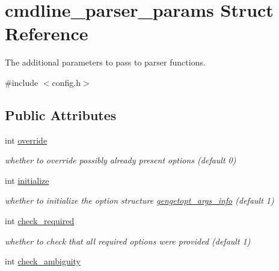 \hypertarget{structcmdline__parser__params}{}\section{cmdline\+\_\+parser\+\_\+params Struct Reference}
\label{structcmdline__parser__params}


The additional parameters to pass to parser functions.  




{\ttfamily \#include $<$config.\+h$>$}

\subsection*{Public Attributes}
\begin{DoxyCompactItemize}
\item 
\hypertarget{structcmdline__parser__params_ad3ff9d69146e69a47506782197b5675c}{}int \hyperlink{structcmdline__parser__params_ad3ff9d69146e69a47506782197b5675c}{override}\label{structcmdline__parser__params_ad3ff9d69146e69a47506782197b5675c}

\begin{DoxyCompactList}\small\item\em whether to override possibly already present options (default 0) \end{DoxyCompactList}\item 
\hypertarget{structcmdline__parser__params_a97ed8a6eabd39291ae7d73f273e12c11}{}int \hyperlink{structcmdline__parser__params_a97ed8a6eabd39291ae7d73f273e12c11}{initialize}\label{structcmdline__parser__params_a97ed8a6eabd39291ae7d73f273e12c11}

\begin{DoxyCompactList}\small\item\em whether to initialize the option structure \hyperlink{structgengetopt__args__info}{gengetopt\+\_\+args\+\_\+info} (default 1) \end{DoxyCompactList}\item 
\hypertarget{structcmdline__parser__params_a44ff439d7e9e36799e59173af74829c6}{}int \hyperlink{structcmdline__parser__params_a44ff439d7e9e36799e59173af74829c6}{check\+\_\+required}\label{structcmdline__parser__params_a44ff439d7e9e36799e59173af74829c6}

\begin{DoxyCompactList}\small\item\em whether to check that all required options were provided (default 1) \end{DoxyCompactList}\item 
\hypertarget{structcmdline__parser__params_a6e4442704fc40b0b655f7cc602f13ec4}{}int \hyperlink{structcmdline__parser__params_a6e4442704fc40b0b655f7cc602f13ec4}{check\+\_\+ambiguity}\label{structcmdline__parser__params_a6e4442704fc40b0b655f7cc602f13ec4}


\end{DoxyCompactItemize}
